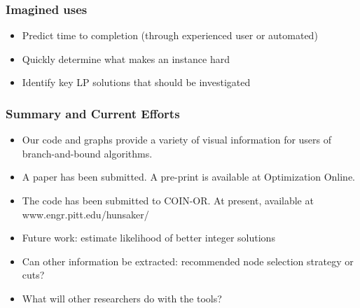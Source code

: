 \documentclass{beamer}
\begin{document}

\begin{frame}
\frametitle{Imagined uses}

\begin{itemize}[<+->]
\item Predict time to completion (through experienced user or automated) 
\item Quickly determine what makes an instance hard
\item Identify key LP solutions that should be investigated
\end{itemize}
\end{frame}

\begin{frame}
\frametitle{Summary and Current Efforts}
\begin{itemize}[<+->]
\item Our code and graphs provide a variety of visual information for users of
branch-and-bound algorithms.
\item A paper has been submitted.  A pre-print is available at Optimization
Online.
\item The code has been submitted to COIN-OR.  At present, available at
www.engr.pitt.edu/hunsaker/
\item Future work: estimate likelihood of better integer solutions
\item Can other information be extracted: recommended node selection strategy
or cuts?
\item What will other researchers do with the tools?
\end{itemize}
\end{frame}
\end{document}
